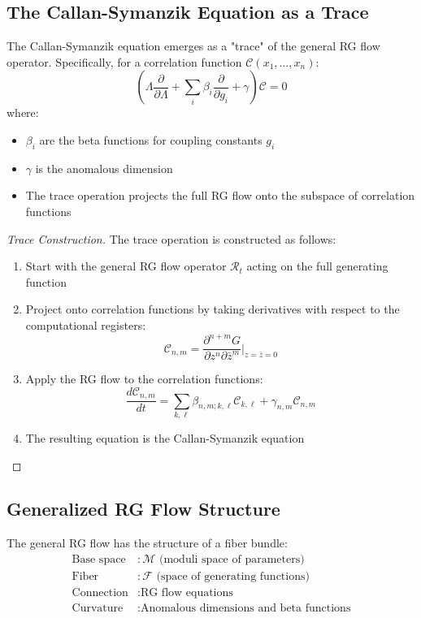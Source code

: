 \subsection{The Callan-Symanzik Equation as a Trace}

\begin{theorem}
\label{thm:callan-symanzik-trace}
The Callan-Symanzik equation emerges as a "trace" of the general RG flow operator. Specifically, for a correlation function $\mathcal{C}(x_1, \ldots, x_n)$:
\[
\left(\Lambda \frac{\partial}{\partial \Lambda} + \sum_i \beta_i \frac{\partial}{\partial g_i} + \gamma\right) \mathcal{C} = 0
\]
where:
\begin{itemize}
\item $\beta_i$ are the beta functions for coupling constants $g_i$
\item $\gamma$ is the anomalous dimension
\item The trace operation projects the full RG flow onto the subspace of correlation functions
\end{itemize}
\end{theorem}

\begin{proof}[Trace Construction]
The trace operation is constructed as follows:
\begin{enumerate}
\item Start with the general RG flow operator $\mathcal{R}_t$ acting on the full generating function
\item Project onto correlation functions by taking derivatives with respect to the computational registers:
\[
\mathcal{C}_{n,m} = \frac{\partial^{n+m} G}{\partial z^n \partial \bar{z}^m}\Big|_{z=\bar{z}=0}
\]
\item Apply the RG flow to the correlation functions:
\[
\frac{d\mathcal{C}_{n,m}}{dt} = \sum_{k,\ell} \beta_{n,m;k,\ell} \mathcal{C}_{k,\ell} + \gamma_{n,m} \mathcal{C}_{n,m}
\]
\item The resulting equation is the Callan-Symanzik equation
\end{enumerate}
\end{proof}

\subsection{Generalized RG Flow Structure}

\begin{definition}
\label{def:rg-flow-structure}
The general RG flow has the structure of a fiber bundle:
\begin{align}
\text{Base space} &: \mathcal{M} \text{ (moduli space of parameters)} \\
\text{Fiber} &: \mathcal{F} \text{ (space of generating functions)} \\
\text{Connection} &: \text{RG flow equations} \\
\text{Curvature} &: \text{Anomalous dimensions and beta functions}
\end{align}
\end{definition}

